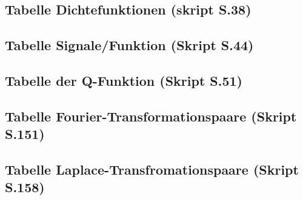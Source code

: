 \documentclass[margin=normal]{tex/hsrzf}
\begin{document}
\subsection{Tabelle Dichtefunktionen (skript S.38)}
\subsection{Tabelle Signale/Funktion (Skript S.44)}
\subsection{Tabelle der Q-Funktion (Skript S.51)}
\subsection{Tabelle Fourier-Transformationspaare (Skript S.151)}
\subsection{Tabelle Laplace-Transfromationspaare (Skript S.158)}


\end{document}
